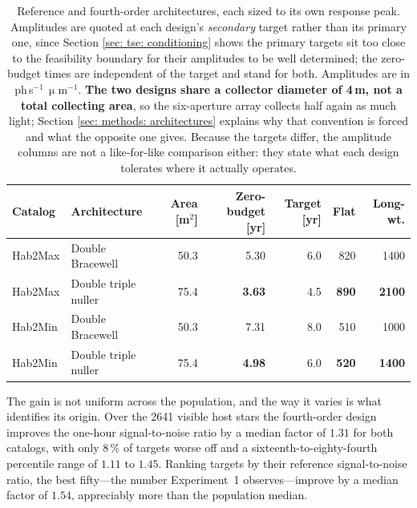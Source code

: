 \documentclass[12pt,a4paper]{article}
\numberwithin{equation}{section}
\numberwithin{figure}{section}
\numberwithin{table}{section}
\begin{document}
\begin{table}[htbp]
\centering
\small
\begin{tabular}{@{}llrrrrr@{}}
\toprule
Catalog & Architecture & Area [m$^2$] & Zero-budget [yr] & Target [yr] & Flat & Long-wt. \\
\midrule
Hab2Max & Double Bracewell     & 50.3 & 5.30 & 6.0 & 820 & 1400 \\
Hab2Max & Double triple nuller & 75.4 & \textbf{3.63} & 4.5 & \textbf{890} & \textbf{2100} \\
Hab2Min & Double Bracewell     & 50.3 & 7.31 & 8.0 & 510 & 1000 \\
Hab2Min & Double triple nuller & 75.4 & \textbf{4.98} & 6.0 & \textbf{520} & \textbf{1400} \\
\bottomrule
\end{tabular}
\caption{Reference and fourth-order architectures, each sized to its own response peak. Amplitudes are quoted at each design's \emph{secondary} target rather than its primary one, since Section \ref{sec: tse: conditioning} shows the primary targets sit too close to the feasibility boundary for their amplitudes to be well determined; the zero-budget times are independent of the target and stand for both. Amplitudes are in ph\,s$^{-1}$\,$\upmu$m$^{-1}$. \textbf{The two designs share a collector diameter of 4\,m, not a total collecting area}, so the six-aperture array collects half again as much light; Section \ref{sec: methods: architectures} explains why that convention is forced and what the opposite one gives. Because the targets differ, the amplitude columns are not a like-for-like comparison either: they state what each design tolerates where it actually operates.}
\label{tab: architecture comparison}
\end{table}

The gain is not uniform across the population, and the way it varies is what identifies its origin. Over the 2641 visible host stars the fourth-order design improves the one-hour signal-to-noise ratio by a median factor of $1.31$ for both catalogs, with only $8\,\%$ of targets worse off and a sixteenth-to-eighty-fourth percentile range of $1.11$ to $1.45$. Ranking targets by their reference signal-to-noise ratio, the best fifty---the number Experiment~1 observes---improve by a median factor of $1.54$, appreciably more than the population median.
\end{document}

